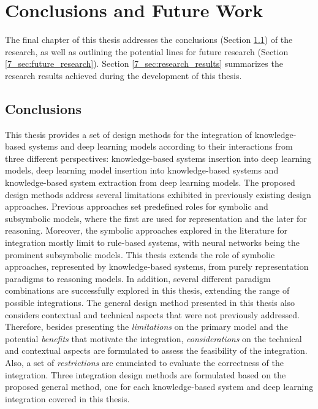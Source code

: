 \chapter{Conclusions and Future Work}
\label{chap:conc}
The final chapter of this thesis addresses the conclusions (Section \ref{7_sec:conclusions}) of the research, as well as outlining the potential lines for future research (Section \ref{7_sec:future_research}). Section \ref{7_sec:research_results} summarizes the research results achieved during the development of this thesis.

\section{Conclusions}\label{7_sec:conclusions}
This thesis provides a set of design methods for the integration of knowledge-based systems and deep learning models according to their interactions from three different perspectives: knowledge-based systems insertion into deep learning models, deep learning model insertion into knowledge-based systems and knowledge-based system extraction from deep learning models. The proposed design methods address several limitations exhibited in previously existing design approaches. Previous approaches set predefined roles for symbolic and subsymbolic models, where the first are used for representation and the later for reasoning. Moreover, the symbolic approaches explored in the literature for integration mostly limit to rule-based systems, with neural networks being the prominent subsymbolic models. This thesis extends the role of symbolic approaches, represented by knowledge-based systems, from purely representation paradigms to reasoning models. In addition, several different paradigm combinations are successfully explored in this thesis, extending the range of possible integrations. The general design method presented in this thesis also considers contextual and technical aspects that were not previously addressed. Therefore, besides presenting the \textit{limitations} on the primary model and the potential \textit{benefits} that motivate the integration, \textit{considerations} on the technical and contextual aspects are formulated to assess the feasibility of the integration. Also, a set of \textit{restrictions} are enunciated to evaluate the correctness of the integration. Three integration design methods are formulated based on the proposed general method, one for each knowledge-based system and deep learning integration covered in this thesis.

